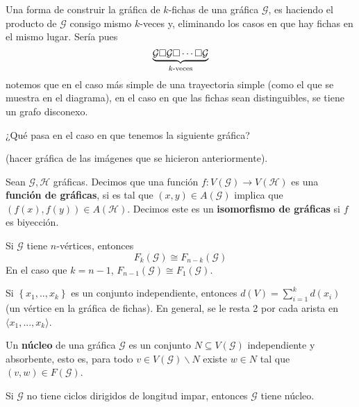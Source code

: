 \documentclass[12pt]{report}
\theoremstyle{largebreak}
\newcommand\cf[3]{\ensuremath{#1:#2\rightarrow#3}}
\begin{document}
    \begin{obs}
        Una forma de construir la gráfica de $k$-fichas de una gráfica $\mathcal{G}$, es haciendo el producto de $\mathcal{G}$ consigo mismo $k$-veces y, eliminando los casos en que hay fichas en el mismo lugar. Sería pues
        \begin{equation*}
            \underbrace{\mathcal{G}\square\mathcal{G}\square\cdots\square\mathcal{G}}_{k\textup{-veces}}
        \end{equation*}
        notemos que en el caso más simple de una trayectoria simple (como el que se muestra en el diagrama), en el caso en que las fichas sean distinguibles, se tiene un grafo disconexo.
    \end{obs}

    ¿Qué pasa en el caso en que tenemos la siguiente gráfica?

    (hacer gráfica de las imágenes que se hicieron anteriormente).

    \begin{mydef}
        Sean $\mathcal{G},\mathcal{H}$ gráficas. Decimos que una función $\cf{f}{V(\mathcal{G})}{V(\mathcal{H})}$ es una \textbf{función de gráficas}, si es tal que $(x,y)\in A(\mathcal{G})$ implica que $(f(x),f(y))\in A(\mathcal{H})$. Decimos este es un \textbf{isomorfismo de gráficas} si $f$ es biyección.
    \end{mydef}

    \begin{obs}
        Si $\mathcal{G}$ tiene $n$-vértices, entonces
        \begin{equation*}
            F_k(\mathcal{G})\cong F_{ n-k}(\mathcal{G})
        \end{equation*}
        En el caso que $k=n-1$, $F_{n-1}(\mathcal{G})\cong F_{1}(\mathcal{G})$.
    \end{obs}

    Si $\left\{x_1,..,x_k \right\}$ es un conjunto independiente, entonces $d(V)=\sum_{ i=1}^k d(x_i)$ (un vértice en la gráfica de fichas). En general, se le resta 2 por cada arista en $\langle x_1,...,x_k\rangle$.
    
    \begin{mydef}
        Un \textbf{núcleo} de una gráfica $\mathcal{G}$ es un conjunto $N\subseteq V(\mathcal{G})$ independiente y absorbente, esto es, para todo $v\in V(\mathcal{G})\backslash N$ existe $w\in N$ tal que $(v,w)\in F(\mathcal{G})$.
    \end{mydef}

    \begin{theor}
        Si $\mathcal{G}$ no tiene ciclos dirigidos de longitud impar, entonces $\mathcal{G}$ tiene núcleo.
    \end{theor}
\end{document}
